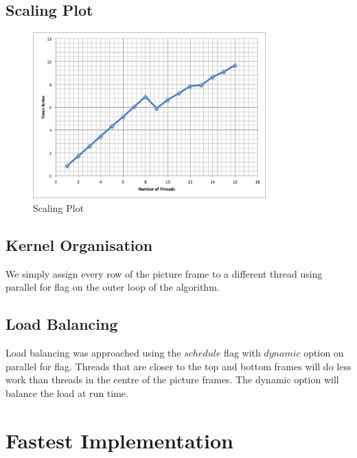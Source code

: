 \documentclass[11pt,letter]{article}
\begin{document}
\subsection{Scaling Plot}
\begin{figure}[h]
\centering
\includegraphics[width=0.8\textwidth]{graph.png}
\caption{Scaling Plot}
\label{fig:awesome_image}
\end{figure}
\subsection{Kernel Organisation}
We simply assign every row of the picture frame to a different thread using parallel for flag on the outer loop of the algorithm. 

\subsection{Load Balancing}
Load balancing was approached using the $schedule$ flag with $dynamic$ option on parallel for flag. Threads that are closer to the top and bottom frames will do less work than threads in the centre of the picture frames. The dynamic option will balance the load at run time.


\section{Fastest Implementation}
\end{document}
